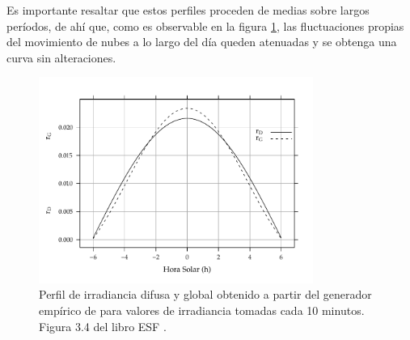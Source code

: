 Es importante resaltar que estos perfiles proceden de medias sobre largos períodos, de ahí que, como es observable en la figura \ref{fig:orgfed4192}, las fluctuaciones propias del movimiento de nubes a lo largo del día queden atenuadas y se obtenga una curva sin alteraciones.
\begin{figure}[htbp]
\centering
\includegraphics[keepaspectratio,width=0.8\textwidth,height=0.5\textheight]{figuras/RgRd.pdf}
\caption{\label{fig:orgfed4192}Perfil de irradiancia difusa y global obtenido a partir del generador empírico de \cite{Collares-Pereira.Rabl1979} para valores de irradiancia tomadas cada 10 minutos. Figura 3.4 del libro ESF \cite{Perpinan2023}.}
\end{figure}

